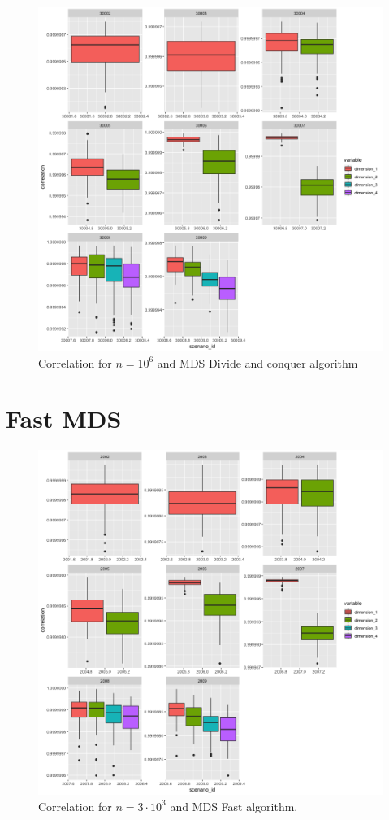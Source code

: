 \documentclass[11pt]{report}
\begin{document}
\begin{figure}[ht]
\centering
    \includegraphics[scale = 1.5]{./images/divide_correlation_1000000.png}
    \caption{Correlation for $n = 10^6$ and MDS Divide and conquer algorithm}
    \label{divide_correlation_1000000}
\end{figure}
\FloatBarrier

\section{Fast MDS}
\label{fast_corr}
\begin{figure}[ht]
\centering
    \includegraphics[scale = 1.5]{./images/fast_correlation_3000.png}
    \caption{Correlation for $n = 3 \cdot 10^3$ and MDS Fast algorithm.}
    \label{fast_correlation_3000}
\end{figure}
\end{document}
